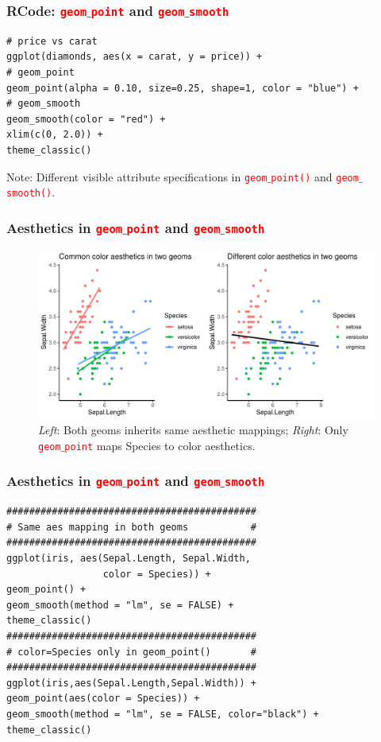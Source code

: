 \documentclass{beamer}
\begin{document}
\begin{frame}[fragile]\frametitle{RCode: \textcolor{red}{\texttt{geom}}$\_$\textcolor{red}{\texttt{point}} and \textcolor{red}{\texttt{geom}}$\_$\textcolor{red}{\texttt{smooth}}}

\begin{lstlisting}
# price vs carat
ggplot(diamonds, aes(x = carat, y = price)) +
# geom_point
geom_point(alpha = 0.10, size=0.25, shape=1, color = "blue") +
# geom_smooth
geom_smooth(color = "red") +
xlim(c(0, 2.0)) +
theme_classic() 
\end{lstlisting}
Note: Different visible attribute specifications in \textcolor{red}{\texttt{geom}}$\_$\textcolor{red}{\texttt{point()}} and \textcolor{red}{\texttt{geom}}$\_$\textcolor{red}{\texttt{smooth()}}.
\end{frame}

\begin{frame}\frametitle{Aesthetics in \textcolor{red}{\texttt{geom}}$\_$\textcolor{red}{\texttt{point}} and \textcolor{red}{\texttt{geom}}$\_$\textcolor{red}{\texttt{smooth}}}
\begin{figure}
\includegraphics[width=0.99\linewidth]{PlotsLec2/scatter_aes_examples}
\caption{\small{\textit{Left}: Both geoms inherits same aesthetic mappings; \textit{Right}: Only \textcolor{red}{\texttt{geom}}$\_$\textcolor{red}{\texttt{point}} maps Species to color aesthetics.}}
\end{figure}
\end{frame}

\begin{frame}[fragile]\frametitle{Aesthetics in \textcolor{red}{\texttt{geom}}$\_$\textcolor{red}{\texttt{point}} and \textcolor{red}{\texttt{geom}}$\_$\textcolor{red}{\texttt{smooth}}}
\lstset{basicstyle=\small\ttfamily}
\begin{lstlisting}
############################################
# Same aes mapping in both geoms           #
############################################
ggplot(iris, aes(Sepal.Length, Sepal.Width, 
                 color = Species)) +
geom_point() +
geom_smooth(method = "lm", se = FALSE) +
theme_classic()
############################################
# color=Species only in geom_point()       #
############################################
ggplot(iris,aes(Sepal.Length,Sepal.Width)) +
geom_point(aes(color = Species)) +
geom_smooth(method = "lm", se = FALSE, color="black") +
theme_classic()
\end{lstlisting}
\end{frame}
\end{document}
